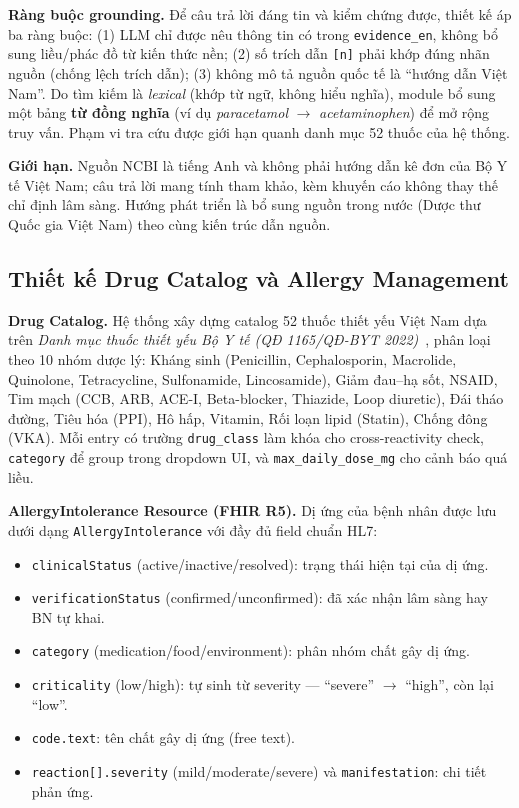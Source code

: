 \documentclass[a4paper,13pt,3p,twoside,openany]{report}
\theoremstyle{definition}
\theoremstyle{remark}
\theoremstyle{definition}
\let\ORIGsubsection\subsection
\renewcommand{\subsection}{\needspace{3\baselineskip}\ORIGsubsection}
\begin{document}
\textbf{Ràng buộc grounding.} Để câu trả lời đáng tin và kiểm chứng được, thiết kế áp ba ràng buộc: (1) LLM chỉ được nêu thông tin có trong \texttt{evidence\_en}, không bổ sung liều/phác đồ từ kiến thức nền; (2) số trích dẫn \texttt{[n]} phải khớp đúng nhãn nguồn (chống lệch trích dẫn); (3) không mô tả nguồn quốc tế là ``hướng dẫn Việt Nam''. Do tìm kiếm là \textit{lexical} (khớp từ ngữ, không hiểu nghĩa), module bổ sung một bảng \textbf{từ đồng nghĩa} (ví dụ \textit{paracetamol} $\to$ \textit{acetaminophen}) để mở rộng truy vấn. Phạm vi tra cứu được giới hạn quanh danh mục 52 thuốc của hệ thống.

\textbf{Giới hạn.} Nguồn NCBI là tiếng Anh và không phải hướng dẫn kê đơn của Bộ Y tế Việt Nam; câu trả lời mang tính tham khảo, kèm khuyến cáo không thay thế chỉ định lâm sàng. Hướng phát triển là bổ sung nguồn trong nước (Dược thư Quốc gia Việt Nam) theo cùng kiến trúc dẫn nguồn.

\subsection{Thiết kế Drug Catalog và Allergy Management}

\textbf{Drug Catalog.} Hệ thống xây dựng catalog 52 thuốc thiết yếu Việt Nam dựa trên \textit{Danh mục thuốc thiết yếu Bộ Y tế (QĐ 1165/QĐ-BYT 2022)}~\cite{qd1165}, phân loại theo 10 nhóm dược lý: Kháng sinh (Penicillin, Cephalosporin, Macrolide, Quinolone, Tetracycline, Sulfonamide, Lincosamide), Giảm đau--hạ sốt, NSAID, Tim mạch (CCB, ARB, ACE-I, Beta-blocker, Thiazide, Loop diuretic), Đái tháo đường, Tiêu hóa (PPI), Hô hấp, Vitamin, Rối loạn lipid (Statin), Chống đông (VKA). Mỗi entry có trường \texttt{drug\_class} làm khóa cho cross-reactivity check, \texttt{category} để group trong dropdown UI, và \texttt{max\_daily\_dose\_mg} cho cảnh báo quá liều.

\textbf{AllergyIntolerance Resource (FHIR R5).} Dị ứng của bệnh nhân được lưu dưới dạng \texttt{AllergyIntolerance} với đầy đủ field chuẩn HL7:
\begin{itemize}
  \item \texttt{clinicalStatus} (active/inactive/resolved): trạng thái hiện tại của dị ứng.
  \item \texttt{verificationStatus} (confirmed/unconfirmed): đã xác nhận lâm sàng hay BN tự khai.
  \item \texttt{category} (medication/food/environment): phân nhóm chất gây dị ứng.
  \item \texttt{criticality} (low/high): tự sinh từ severity --- ``severe'' $\to$ ``high'', còn lại ``low''.
  \item \texttt{code.text}: tên chất gây dị ứng (free text).
  \item \texttt{reaction[].severity} (mild/moderate/severe) và \texttt{manifestation}: chi tiết phản ứng.
\end{itemize}
\end{document}
